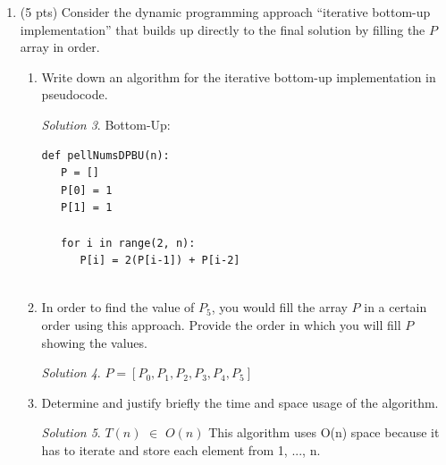 \documentclass[12pt]{article}
\theoremstyle{remark}
\newtheorem*{solution}{Solution}
\begin{document}
\begin{enumerate}
\begin{enumerate}
\begin{enumerate}
	\item In order to find the value of $P_5$, you would fill the array $P$ in a certain order. Provide the order in which you will fill $P$ showing the values. \\
	\begin{solution}
$P = [P_5, P_4, P_3, P_2, P_1, P_0]$
    \end{solution}
	

	\item Determine and justify briefly the asymptotic running time $T(n)$ of the algorithm. \\
	\begin{solution}
$T(n)$ $\in$ $O(n)$ This approach runs in O(n) time because it must go through all of the sub-problems and store them at least once in the worst case.
    \end{solution}
	
	\end{enumerate}
	
	\item (5 pts) Consider the dynamic programming approach ``iterative bottom-up implementation'' that builds up directly to the final solution by filling the $P$ array in order. 	
	\begin{enumerate}
	\item Write down an algorithm for the iterative bottom-up implementation in pseudocode.  \\
    \begin{solution} Bottom-Up: \\
\begin{verbatim}
def pellNumsDPBU(n):
   P = []
   P[0] = 1
   P[1] = 1

   for i in range(2, n):
      P[i] = 2(P[i-1]) + P[i-2]
   
\end{verbatim}
    \end{solution}
    
    \item In order to find the value of $P_5$, you would fill the array $P$ in a certain order using this approach. Provide the order in which you will fill $P$ showing the values. \\
    \begin{solution}
$P = [P_0, P_1, P_2, P_3, P_4, P_5]$
    \end{solution}
    
	\item Determine and justify briefly the time and space usage of the algorithm. \\
	\begin{solution}
$T(n)$ $\in$ $O(n)$ This algorithm uses O(n) space because it has to iterate and store each element from 1, ..., n.
    \end{solution}
	

\end{enumerate}
\end{enumerate}
\end{enumerate}
\end{document}
